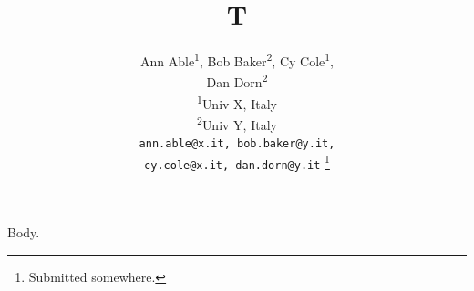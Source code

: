 \documentclass[12pt,onecolumn]{IEEEtran}
\begin{document}
\title{T}
\author{
Ann Able\textsuperscript{1}, Bob Baker\textsuperscript{2}, Cy Cole\textsuperscript{1}, \\
Dan Dorn\textsuperscript{2} \\[1em]
\textsuperscript{1}Univ X, Italy \\
\textsuperscript{2}Univ Y, Italy \\[1em]
\texttt{ann.able@x.it, bob.baker@y.it,}\\
\texttt{cy.cole@x.it, dan.dorn@y.it}
\footnote{Submitted somewhere.}
}
\maketitle
Body.
\end{document}
